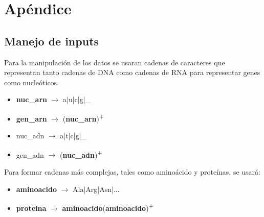 \documentclass[12pt,a4paper,english,spanish]{article}
\begin{document}
\section{Apéndice}
\subsection{Manejo de inputs}
\par Para la manipulación de los datos se usaran cadenas de caracteres que representan tanto cadenas de DNA como cadenas de RNA para representar genes como nucleóticos.
\begin{itemize}
	\item \textbf{nuc\_arn} $\to$  a|u|c|g|\_ 
	\item \textbf{gen\_arn} $\to$ (\textbf{nuc\_arn})\textsuperscript{+}

	\item {nuc\_adn} $\to$ a|t|c|g|\_
	\item {gen\_adn} $\to$ (\textbf{nuc\_adn})\textsuperscript{+}
\end{itemize}
\par Para formar cadenas más complejas, tales como aminoácido y proteínas, se usará:
\begin{itemize}
 	\item \textbf{aminoacido} $\to$ Ala|Arg|Asn|...	
	\item \textbf{proteina} $\to$ \textbf{aminoacido}(\textbf{aminoacido})\textsuperscript{+}
\end{itemize}
\end{document}
